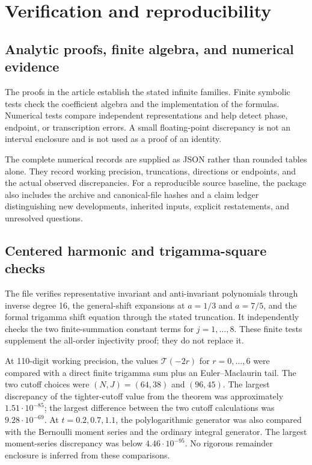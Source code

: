 \section{Verification and reproducibility}
\label{verify:section}

\subsection{Analytic proofs, finite algebra, and numerical evidence}

The proofs in the article establish the stated infinite families.
Finite symbolic tests check the coefficient algebra and the
implementation of the formulas. Numerical tests compare independent
representations and help detect phase, endpoint, or transcription
errors. A small floating-point discrepancy is not an interval
enclosure and is not used as a proof of an identity.

The complete numerical records are supplied as JSON rather than
rounded tables alone. They record working precision, truncations,
directions or endpoints, and the actual observed discrepancies.
For a reproducible source baseline, the package also includes the
archive and canonical-file hashes and a claim ledger distinguishing
new developments, inherited inputs, explicit restatements, and
unresolved questions.

\subsection{Centered harmonic and trigamma-square checks}

The file  verifies representative
invariant and anti-invariant polynomials through inverse degree 16,
the general-shift expansions at $a=1/3$ and $a=7/5$, and the formal
trigamma shift equation through the stated truncation. It independently
checks the two finite-summation constant terms for $j=1,\ldots,8$.
These finite tests supplement the all-order injectivity proof;
they do not replace it.

At 110-digit working precision, the values $\mathcal T(-2r)$ for
$r=0,\ldots,6$ were compared with a direct finite trigamma sum plus
an Euler--Maclaurin tail. The two cutoff choices were
$(N,J)=(64,38)$ and $(96,45)$. The largest discrepancy of the
tighter-cutoff value from the theorem was approximately
$1.51\cdot10^{-85}$; the largest difference between the two
cutoff calculations was $9.28\cdot10^{-69}$.
At $t=0.2,0.7,1.1$, the polylogarithmic generator was also compared
with the Bernoulli moment series and the ordinary integral generator.
The largest moment-series discrepancy was below $4.46\cdot10^{-95}$.
No rigorous remainder enclosure is inferred from these comparisons.

